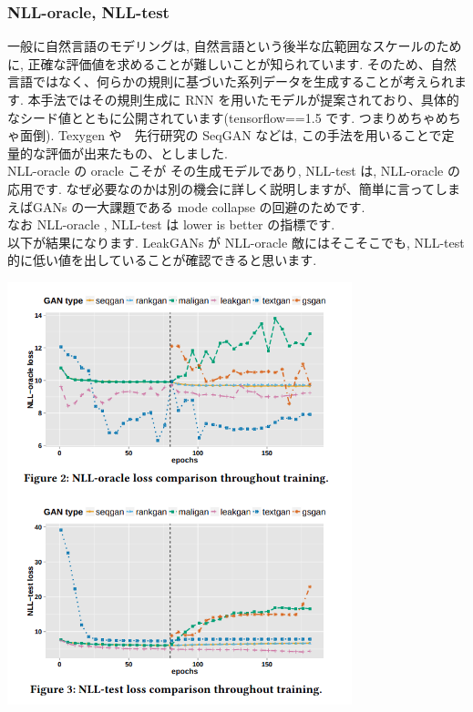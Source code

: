 \documentclass[a4paper, dvipdfmx, 10pt]{article}
\begin{document}
\subsubsection{NLL-oracle, NLL-test}
\label{sec:orge269dd3}
一般に自然言語のモデリングは, 自然言語という後半な広範囲なスケールのために, 正確な評価値を求めることが難しいことが知られています. そのため、自然言語ではなく、何らかの規則に基づいた系列データを生成することが考えられます. 本手法ではその規則生成に RNN を用いたモデルが提案されており、具体的なシード値とともに公開されています(tensorflow==1.5 です. つまりめちゃめちゃ面倒). Texygen や　先行研究の SeqGAN などは, この手法を用いることで定量的な評価が出来たもの、としました.\\
NLL-oracle の oracle こそが その生成モデルであり, NLL-test は, NLL-oracle の応用です. なぜ必要なのかは別の機会に詳しく説明しますが、簡単に言ってしまえばGANs の一大課題である mode collapse の回避のためです.\\
なお NLL-oracle , NLL-test は lower is better の指標です.\\
以下が結果になります. LeakGANs が NLL-oracle 敵にはそこそこでも, NLL-test 的に低い値を出していることが確認できると思います.

\begin{center}
\includegraphics[width=10cm]{./img/oracle.png}
\end{center}
\end{document}
